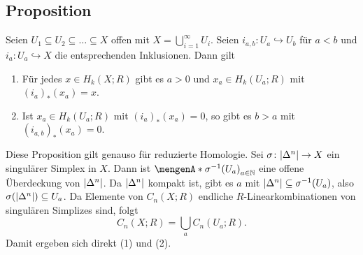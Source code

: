\subsection[Proposition über Homologie von $X= \bigcup_{a \in N} U_a$ wobei $U_a \subseteq U_{a+1}$]{Proposition} %
\label{sub:1011}
Seien $U_1 \subseteq U_2 \subseteq \ldots  \subseteq X$ offen mit $X = \bigcup_{i=1}^\infty U_i$. Seien $i_{a,b} \colon U_a \hookrightarrow U_b$ für $a < b$ und 
$i_a \colon U_a \hookrightarrow X$ die entsprechenden Inklusionen. Dann gilt
\begin{enumerate}[(1)]
	\item Für jedes $x \in H_k(X;R)$ gibt es $a >0$ und $x_a \in H_k(U_a;R)$ mit $(i_a)_*(x_a)=x$.
	\item Ist $x_a \in H_k(U_a;R)$ mit $(i_a)_*(x_a)=0$, so gibt es $b >a$ mit $(i_{a,b})_*(x_a)=0$.
\end{enumerate}
Diese Proposition gilt genauso für reduzierte Homologie.
Sei $\sigma \colon \abs*{\Delta^n} \to X$ ein singulärer Simplex in $X$. Dann ist $\set{\sigma^{-1}(U_a)}_{a \in \mathds{N}}$ eine offene Überdeckung von $\abs*{\Delta^n}$. 
Da $\abs*{\Delta^n}$ kompakt ist, gibt es $a$ mit $\abs*{\Delta^n} \subseteq \sigma ^{-1}(U_a)$, also $\sigma \enbrace*{\abs*{\Delta^n}} \subseteq U_a$. Da Elemente  von
$C_n(X;R)$ endliche $R$-Linearkombinationen von singulären Simplizes sind, folgt 
\[
	C_n(X;R) = \bigcup_a C_n(U_a;R).
\]
Damit ergeben sich direkt (1) und (2). \bewende

